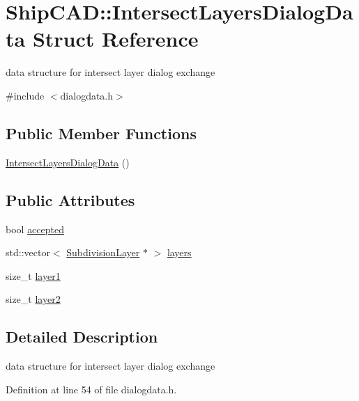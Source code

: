\hypertarget{structShipCAD_1_1IntersectLayersDialogData}{}\section{Ship\+C\+AD\+:\+:Intersect\+Layers\+Dialog\+Data Struct Reference}
\label{structShipCAD_1_1IntersectLayersDialogData}


data structure for intersect layer dialog exchange  




{\ttfamily \#include $<$dialogdata.\+h$>$}

\subsection*{Public Member Functions}
\begin{DoxyCompactItemize}
\item 
\hyperlink{structShipCAD_1_1IntersectLayersDialogData_a0409b79676069fc5f8e7024c6558b400}{Intersect\+Layers\+Dialog\+Data} ()
\end{DoxyCompactItemize}
\subsection*{Public Attributes}
\begin{DoxyCompactItemize}
\item 
bool \hyperlink{structShipCAD_1_1IntersectLayersDialogData_a7e7e7ce1ce0b9f4febc9fa82b1c9a2f8}{accepted}
\item 
std\+::vector$<$ \hyperlink{classShipCAD_1_1SubdivisionLayer}{Subdivision\+Layer} $\ast$ $>$ \hyperlink{structShipCAD_1_1IntersectLayersDialogData_a4eaea862a9ce61c04b6a1d0b972ca9c1}{layers}
\item 
size\+\_\+t \hyperlink{structShipCAD_1_1IntersectLayersDialogData_a2a06240ead3bc2d61dbc5bb3eb21ea99}{layer1}
\item 
size\+\_\+t \hyperlink{structShipCAD_1_1IntersectLayersDialogData_ad138f2eea90f7bac0a9c331375b1704a}{layer2}
\end{DoxyCompactItemize}


\subsection{Detailed Description}
data structure for intersect layer dialog exchange 

Definition at line 54 of file dialogdata.\+h.



